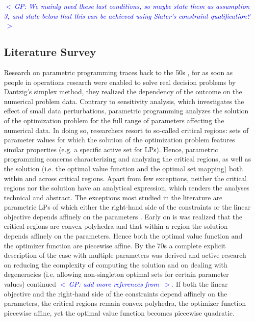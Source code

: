 \documentclass{article}
\newcommand{\commentGP}[1]{\noindent \textcolor{blue}{\emph{$<\,$GP: #1$\,>$}}}%
\begin{document}
\commentGP{We mainly need these last conditions, so maybe state them as assumption 3, and state below that this can be achieved using Slater's constraint qualification?}



\subsection{Literature Survey}

Research on parametric programming traces back to the 50s \cite{Saaty_Gass_1954,Gass_Saaty_1955}, for as soon as people in operations research were enabled to solve real decision problems by Dantzig's simplex method, they realized the dependency of the outcome on the numerical problem data. Contrary to sensitivity analysis, which investigates the effect of small data perturbations, parametric programming analyzes the solution of the optimization problem for the full range of parameters affecting the numerical data. In doing so, researchers resort to so-called critical regions: sets of parameter values for which the solution of the optimization problem features similar properties (e.g. a specific active set for LPs). Hence, parametric programming concerns characterizing and analyzing the critical regions, as well as the solution (i.e. the optimal value function and the optimal set mapping) both within and across critical regions. Apart from few exceptions, neither the critical regions nor the solution have an analytical expression, which renders the analyses technical and abstract. The exceptions most studied in the literature are parametric LPs of which either the right-hand side of the constraints or the linear objective depends affinely on the parameters \cite{Gal_1979,Gal_1984}. Early on is was realized that the critical regions are convex polyhedra and that within a region the solution depends affinely on the parameters. Hence both the optimal value function and the optimizer function are piecewise affine. By the 70s a complete explicit description of the case with multiple parameters was derived \cite{Gal_Nedoma_1972} and active research on reducing the complexity of computing the solution and on dealing with degeneracies (i.e. allowing non-singleton optimal sets for certain parameter values) continued \cite{Borrelli_et_al_2003} \commentGP{add more references from \cite{Alessio2009}}. If both the linear objective and the right-hand side of the constraints depend affinely on the parameters, the critical regions remain convex polyhedra, the optimizer function piecewise affine, yet the optimal value function becomes piecewise quadratic.
\end{document}
